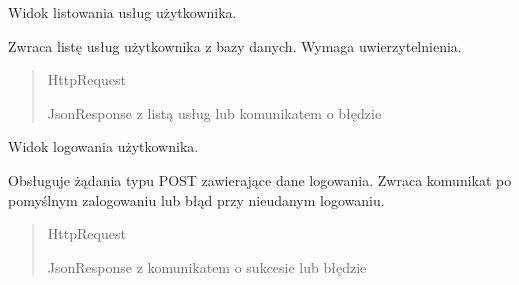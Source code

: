 \documentclass[letterpaper,10pt,polish]{sphinxmanual}
\begin{document}

\begin{fulllineitems}
\label{\detokenize{mainApp:mainApp.views.list_services}}
\pysigstartsignatures
{}
\pysigstopsignatures
\sphinxAtStartPar
Widok listowania usług użytkownika.

\sphinxAtStartPar
Zwraca listę usług użytkownika z bazy danych.
Wymaga uwierzytelnienia.
\begin{quote}\begin{description}
\sphinxAtStartPar
{} \textendash{} HttpRequest

\sphinxAtStartPar
JsonResponse z listą usług lub komunikatem o błędzie

\end{description}\end{quote}

\end{fulllineitems}


\begin{fulllineitems}
\label{\detokenize{mainApp:mainApp.views.login_view}}
\pysigstartsignatures
{}
\pysigstopsignatures
\sphinxAtStartPar
Widok logowania użytkownika.

\sphinxAtStartPar
Obsługuje żądania typu POST zawierające dane logowania.
Zwraca komunikat po pomyślnym zalogowaniu lub błąd przy nieudanym logowaniu.
\begin{quote}\begin{description}
\sphinxAtStartPar
{} \textendash{} HttpRequest

\sphinxAtStartPar
JsonResponse z komunikatem o sukcesie lub błędzie

\end{description}\end{quote}

\end{fulllineitems}
\end{document}
